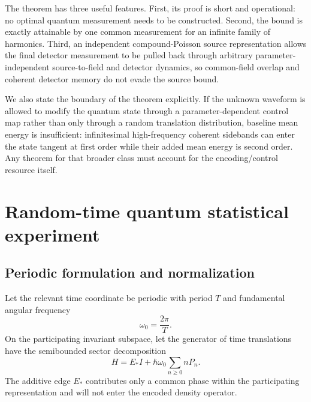 \documentclass[aps,pra,reprint,amsmath,amssymb,longbibliography]{revtex4-2}
\begin{document}
The theorem has three useful features.  First, its proof is short and operational: no optimal quantum measurement needs to be constructed.  Second, the bound is exactly attainable by one common measurement for an infinite family of harmonics.  Third, an independent compound-Poisson source representation allows the final detector measurement to be pulled back through arbitrary parameter-independent source-to-field and detector dynamics, so common-field overlap and coherent detector memory do not evade the source bound.

We also state the boundary of the theorem explicitly.  If the unknown waveform is allowed to modify the quantum state through a parameter-dependent control map rather than only through a random translation distribution, baseline mean energy is insufficient: infinitesimal high-frequency coherent sidebands can enter the state tangent at first order while their added mean energy is second order.  Any theorem for that broader class must account for the encoding/control resource itself.

\section{Random-time quantum statistical experiment}
\label{sec:model}

\subsection{Periodic formulation and normalization}

Let the relevant time coordinate be periodic with period $T$ and fundamental angular frequency
\begin{equation}
 \omega_0=\frac{2\pi}{T}.
\end{equation}
On the participating invariant subspace, let the generator of time translations have the semibounded sector decomposition
\begin{equation}
 H=E_* I+\hbar\omega_0\sum_{n\geq0} n P_n .
 \label{eq:H-periodic}
\end{equation}
The additive edge $E_*$ contributes only a common phase within the participating representation and will not enter the encoded density operator.
\end{document}
